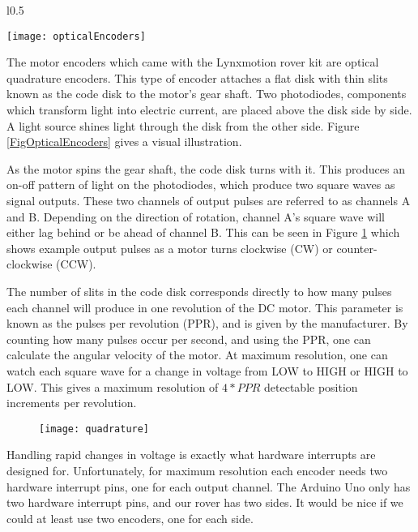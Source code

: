 \begin{wrapfigure}{l}{0.5\textwidth}
	\caption{\cite{fig_optical_encoders}}
	\centering
	\texttt{[image: opticalEncoders]}
	\label{FigOpticalEncoders}
\end{wrapfigure}

The motor encoders which came with the Lynxmotion rover kit are optical quadrature encoders. This type of encoder attaches a flat disk with thin slits known as the code disk to the motor's gear shaft. Two photodiodes, components which transform light into electric current, are placed above the disk side by side. A light source shines light through the disk from the other side. Figure \ref{FigOpticalEncoders} gives a visual illustration.

As the motor spins the gear shaft, the code disk turns with it. This produces an on-off pattern of light on the photodiodes, which produce two square waves as signal outputs. These two channels of output pulses are referred to as channels A and B. Depending on the direction of rotation, channel A's square wave will either lag behind or be ahead of channel B. This can be seen in Figure \ref{FigQuadChannels} which shows example output pulses as a motor turns clockwise (CW) or counter-clockwise (CCW). \cite{encoderBlog}

The number of slits in the code disk corresponds directly to how many pulses each channel will produce in one revolution of the DC motor. This parameter is known as the pulses per revolution (PPR), and is given by the manufacturer. By counting how many pulses occur per second, and using the PPR, one can calculate the angular velocity of the motor. At maximum resolution, one can watch each square wave for a change in voltage from LOW to HIGH or HIGH to LOW. This gives a maximum resolution of \(4 * PPR\) detectable position increments per revolution.

\begin{figure}[h]
	\caption{\cite{encoderBlog}}
	\centering
	\texttt{[image: quadrature]}
	\label{FigQuadChannels}
\end{figure}

Handling rapid changes in voltage is exactly what hardware interrupts are designed for. Unfortunately, for maximum resolution each encoder needs two hardware interrupt pins, one for each output channel. The Arduino Uno only has two hardware interrupt pins, and our rover has two sides. It would be nice if we could at least use two encoders, one for each side.

